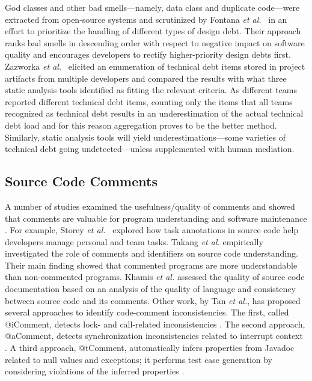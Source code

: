 God classes and other bad smells---namely, data class and duplicate code---were extracted from open-source systems and scrutinized by Fontana \textit{et al.}~\cite{fontana2013code} in an effort to prioritize the handling of different types of design debt. Their approach ranks bad smells in descending order with respect to negative impact on software quality and encourages developers to rectify higher-priority design debts first.\\

Zazworka \textit{et al.}~\cite{zazworka2011investigating} elicited an enumeration of technical debt items stored in project artifacts from multiple developers and compared the results with what three static analysis tools identified as fitting the relevant criteria. As different teams reported different technical debt items, counting only the items that all teams recognized as technical debt results in an underestimation of the actual technical debt load and for this reason aggregation proves to be the better method. Similarly, static analysis tools  will yield underestimations---some varieties of technical debt going undetected---unless supplemented with human mediation.


\subsection{Source Code Comments}

A number of studies examined the usefulness/quality of comments and showed that comments are valuable for program understanding and software maintenance \cite{TakangGM96,tan07icomment,lawrie2006leveraged}. For example, Storey \emph{et al.}~\cite{Storey:2008} explored how task annotations in source code help developers manage personal and team tasks. Takang {\em et al.} \cite{TakangGM96} empirically investigated the role of comments and identifiers on source code understanding. Their main finding showed that commented programs are more understandable than non-commented programs. Khamis {\em et al.} \cite{Khamis:2010} assessed the quality of source code documentation based on an analysis of the quality of language and consistency between source code and its comments. Other work, by Tan {\em et al.}, has proposed several approaches to identify code-comment inconsistencies. The first, called @iComment, detects lock- and call-related inconsistencies \cite{tan07icomment}. The second approach, @aComment, detects synchronization inconsistencies related to interrupt context \cite{acomment}. A third approach, @tComment, automatically infers properties from Javadoc related to null values and exceptions; it performs test case generation by considering violations of the inferred properties \cite{tcomment}.\\



